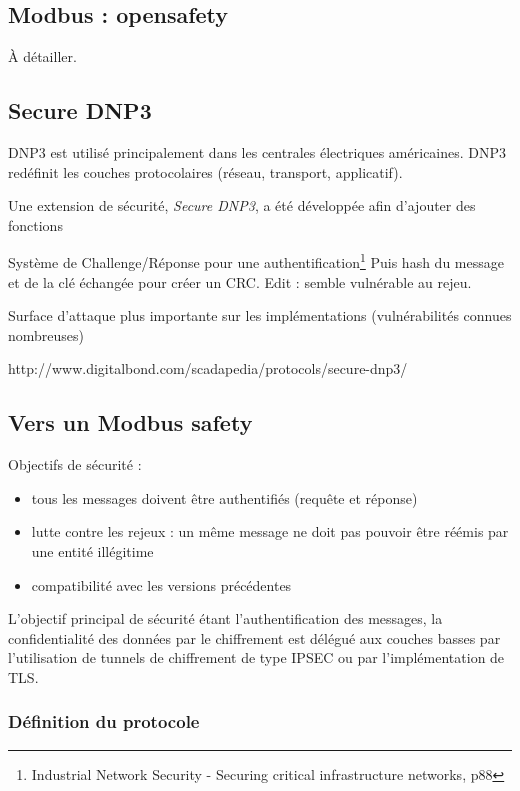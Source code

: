 \documentclass[10pt,a4paper]{article}
\begin{document}
	\subsection{Modbus : opensafety}
    À détailler.

	\subsection{Secure DNP3}
    DNP3 est utilisé principalement dans les centrales électriques américaines. DNP3 redéfinit les couches protocolaires (réseau, transport, applicatif).
    
    Une extension de sécurité, \textit{Secure DNP3}, a été développée afin d'ajouter des fonctions

    Système de Challenge/Réponse pour une authentification\footnote{Industrial Network Security - Securing critical infrastructure networks, p88}
    Puis hash du message et de la clé échangée pour créer un CRC.
    Edit : semble vulnérable au rejeu.
    
    Surface d'attaque plus importante sur les implémentations (vulnérabilités connues nombreuses)
    
	http://www.digitalbond.com/scadapedia/protocols/secure-dnp3/
	
	\subsection{Vers un Modbus safety}

    Objectifs de sécurité :
    \begin{itemize}
    \item tous les messages doivent être authentifiés (requête et réponse)
    \item lutte contre les rejeux : un même message ne doit pas pouvoir être réémis par une entité illégitime
    \item compatibilité avec les versions précédentes
    \end{itemize}

    L'objectif principal de sécurité étant l'authentification des messages, la confidentialité des données par le chiffrement est délégué aux couches basses par l'utilisation de tunnels de chiffrement de type IPSEC ou par l'implémentation de TLS.

    \subsubsection{Définition du protocole}
	    
\end{document}
